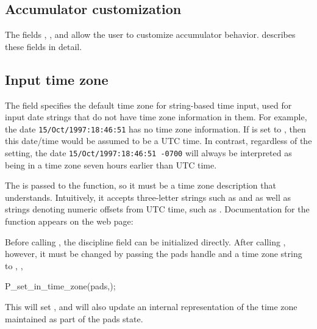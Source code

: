 \subsection{Accumulator customization}
\label{sec:library-customization-accumulator}
The fields , , and
 allow the user to customize accumulator behavior.  
 describes these fields in
detail.

\subsection{Input time zone}
\label{sec:library-customization-input-time-zone}
The field  specifies the default time zone for
string-based time input, used for input date strings 
that do not have time zone information in them.     For example, the date
\texttt{15/Oct/1997:18:46:51} has no time zone information.  If
 is set  to , 
then this date/time would be assumed to be a UTC time.
In contrast, regardless of the  setting, the date
\texttt{15/Oct/1997:18:46:51 -0700}
will always be interpreted as being in a time zone seven hours
earlier than UTC time.

The  is passed to the  function, so it
must be a time zone description that 
understands. Intuitively, it accepts three-letter strings such as 
  and   as well as strings
denoting numeric offsets from UTC time, such as .
Documentation for the  function appears on the web page:

Before calling , the discipline field 
can be initialized directly.  After calling , however, it
must be changed by passing the pads handle and a time zone string to 
, \eg{},

\begin{centercode}
    P\_set\_in\_time\_zone(pads,);
\end{centercode}

This will set , and will also update
an internal representation of the time zone maintained as part of
the pads state.

